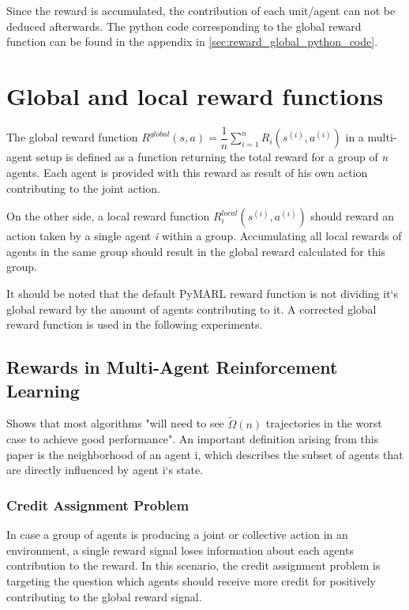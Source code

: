 Since the reward is accumulated, the contribution of each unit/agent can not be deduced afterwards. The python code corresponding to the global reward function can be found in the appendix in \autoref{sec:reward_global_python_code}.

\section{Global and local reward functions}\label{sec:global_local_r_function}
The global reward function $R^{global}(s, a)=\dfrac{1}{n} \sum_{i=1}^{n} R_i\left(s^{(i)}, a^{(i)}\right)$ in a multi-agent setup is defined as a function returning the total reward for a group of \textit{n} agents. Each agent is provided with this reward as result of his own action contributing to the joint action.

On the other side, a local reward function $R_{i}^{local}\left(s^{(i)}, a^{(i)}\right)$ should reward an action taken by a single agent \textit{i} within a group. Accumulating all local rewards of agents in the same group should result in the global reward calculated for this group. \cite{NIPS2005_2951}

It should be noted that the default PyMARL reward function is not dividing it`s global reward by the amount of agents contributing to it. A corrected global reward function is used in the following experiments.

\subsection{Rewards in Multi-Agent Reinforcement Learning}
\cite{NIPS2005_2951} Shows that most algorithms "will need to see $\tilde{\Omega}(n)$ trajectories in the worst case to achieve good performance". An important definition arising from this paper is the neighborhood of an agent i, which describes the subset of agents that are directly influenced by agent i`s state.

\subsubsection{Credit Assignment Problem}
In case a group of agents is producing a joint or collective action in an environment, a single reward signal loses information about each agents contribution to the reward. In this scenario, the credit assignment problem is targeting the question which agents should receive more credit for positively contributing to the global reward signal. \cite{sutton2018reinforcement}

